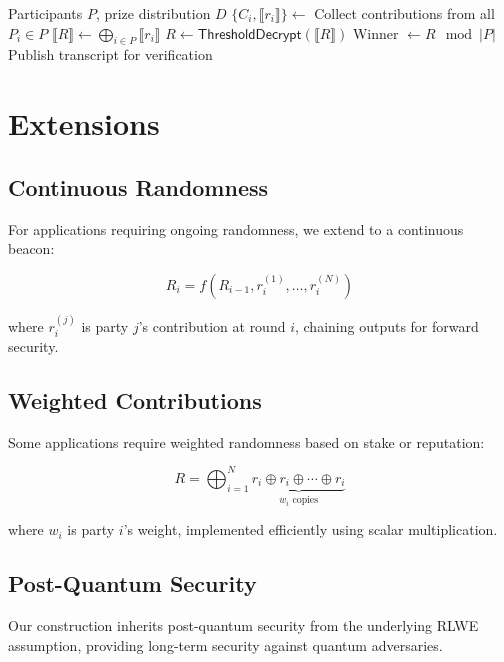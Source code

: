 \documentclass[11pt,a4paper]{article}
\begin{document}
\begin{algorithm}
\caption{Secure Lottery}
\begin{algorithmic}[1]
\Require Participants $P$, prize distribution $D$
\State $\{C_i, \llbracket r_i \rrbracket\} \gets$ Collect contributions from all $P_i \in P$
\State $\llbracket R \rrbracket \gets \bigoplus_{i \in P} \llbracket r_i \rrbracket$
\State $R \gets \textsf{ThresholdDecrypt}(\llbracket R \rrbracket)$
\State Winner $\gets R \mod |P|$
\State Publish transcript for verification
\end{algorithmic}
\end{algorithm}

\section{Extensions}

\subsection{Continuous Randomness}

For applications requiring ongoing randomness, we extend to a continuous beacon:

\begin{equation}
R_i = f(R_{i-1}, r_i^{(1)}, \ldots, r_i^{(N)})
\end{equation}

where $r_i^{(j)}$ is party $j$'s contribution at round $i$, chaining outputs for forward security.

\subsection{Weighted Contributions}

Some applications require weighted randomness based on stake or reputation:

\begin{equation}
R = \bigoplus_{i=1}^N \underbrace{r_i \oplus r_i \oplus \cdots \oplus r_i}_{w_i \text{ copies}}
\end{equation}

where $w_i$ is party $i$'s weight, implemented efficiently using scalar multiplication.

\subsection{Post-Quantum Security}

Our construction inherits post-quantum security from the underlying RLWE assumption, providing long-term security against quantum adversaries.
\end{document}
